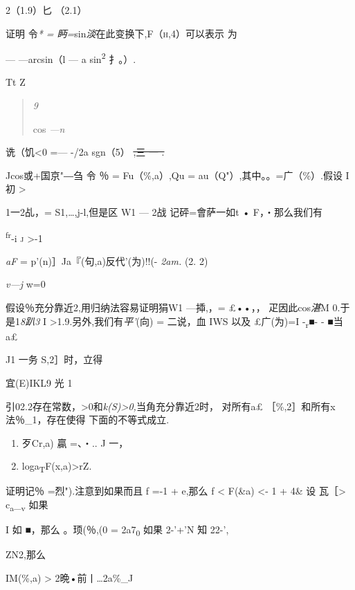 \documentclass{article}
\begin{document}
2（1.9）匕 （2.1）

证明 令\emph{* = 眄=}sin\emph{淡}在此变换下\textsc{,F（h,4）}可以表示 为

--- ---arcsin（l --- a sin\textsuperscript{2} 扌。）.

Tt Z

\begin{quote}
\emph{9}

cos \emph{---n}
\end{quote}

诜（饥\textless{}0 =--- -/2a sgn（5） \sout{,三 一 .}

Jcos或+国京"―刍 令 ％ = Fu（\%,a）,Qu = au（Q"）,其中。。=广（\%）.假设
I初 \textgreater{}

1一2乩，= S1,\ldots{},j-l,但是区\textbar{} W1 --- 2战 记砰=會萨一如t •
F，・那么我们有

\textsuperscript{fr}-i \textsc{j} \textgreater{}-1

\emph{aF} = p'(n)］Ja『(句,a)反代'(为)!!(- \emph{2am.} (2. 2)

\emph{v---j} w=0

假设％充分靠近2,用归纳法容易证明\textbar{}狷W1 ---揷,，= £••，，
疋因此cos\emph{湛}M 0.于是1\emph{8趴3} I
\textgreater{}1.9.另外,我们有\emph{平'}(向) = 二说，血 IWS 以及
£广(为)=I -\textsubscript{r}■- - ■当 a£

J1 一务 S,2］时，立得

宜(E)IKL9 光 1

引02.2存在常数，\textgreater{}0和\emph{k(S)\textgreater{}0,}当角充分靠近2时，
对所有a£ ［\%,2］和所有\textbar{}x\textbar{}法％\_1，存在使得
下面的不等式成立.

\begin{enumerate}
\def\labelenumi{(\arabic{enumi})}
\item
  \textbar{}歹Cr,a) \textbar{} 贏 =、・.. J 一，
\item
  log\textbar{}a\textsubscript{T}F(x,a)\textbar{}\textgreater{}rZ.
\end{enumerate}

证明记％ =烈").注意到如果而且 f =-1 + e,那么 f \textless{} F(\&a)
\textless{}- 1 + 4\& 设 瓦［\textgreater{}
c\textsubscript{a}\_\textsubscript{v} 如果

I 如 ■，那么 \textbar{}。顼(％,(0\textbar{} =
\textbar{}2a7\textsubscript{0}\textbar{} 如果 2-'+'N 知 22-',

ZN2,那么

IM(\%,a)\textbar{} \textgreater{}
\textbar{}2晩•前丨\ldots{}\textbar{}2a\%\_J
\end{document}
